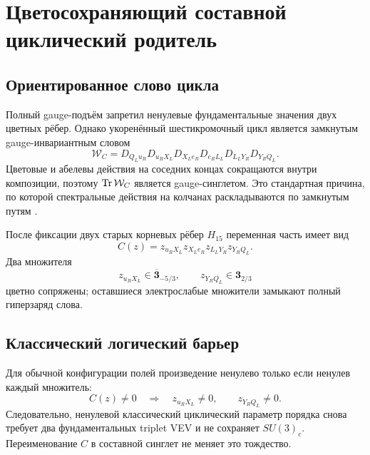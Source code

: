 \chapter{Цветосохраняющий составной циклический родитель}
\label{ch:v7-color-preserving-composite-cycle-parent-gate}

\section{Ориентированное слово цикла}

Полный gauge-подъём запретил ненулевые фундаментальные значения двух
цветных рёбер. Однако укоренённый шестикромочный цикл является замкнутым
gauge-инвариантным словом
\begin{equation}
 \mathcal W_C
 =D_{Q_Lu_R}D_{u_RX_L}D_{X_Le_R}
  D_{e_RL_L}D_{L_LY_R}D_{Y_RQ_L}.
 \label{eq:v7-composite-cycle-full-word}
\end{equation}
Цветовые и абелевы действия на соседних концах сокращаются внутри
композиции, поэтому $\operatorname{Tr}\mathcal W_C$ является gauge-синглетом. Это
стандартная причина, по которой спектральные действия на колчанах
раскладываются по замкнутым путям \cite{v7-composite-cycle-quiver}.

После фиксации двух старых корневых рёбер $H_{15}$ переменная часть имеет
вид
\begin{equation}
 C(z)=
 z_{u_RX_L}z_{X_Le_R}z_{L_LY_R}z_{Y_RQ_L}.
 \label{eq:v7-composite-cycle-new-word}
\end{equation}
Два множителя
\begin{equation}
 z_{u_RX_L}\in\overline{\mathbf3}_{-5/3},
 \qquad
 z_{Y_RQ_L}\in\mathbf3_{2/3}
 \label{eq:v7-composite-cycle-colored-factors}
\end{equation}
цветно сопряжены; оставшиеся электрослабые множители замыкают полный
гиперзаряд слова.

\section{Классический логический барьер}

Для обычной конфигурации полей произведение ненулево только если ненулев
каждый множитель:
\begin{equation}
 C(z)\ne0
 \quad\Longrightarrow\quad
 z_{u_RX_L}\ne0,\qquad z_{Y_RQ_L}\ne0.
 \label{eq:v7-composite-cycle-nonzero-factors}
\end{equation}
Следовательно, ненулевой классический циклический параметр порядка снова
требует два фундаментальных triplet VEV и не сохраняет $SU(3)_c$.
Переименование $C$ в составной синглет не меняет это тождество.

